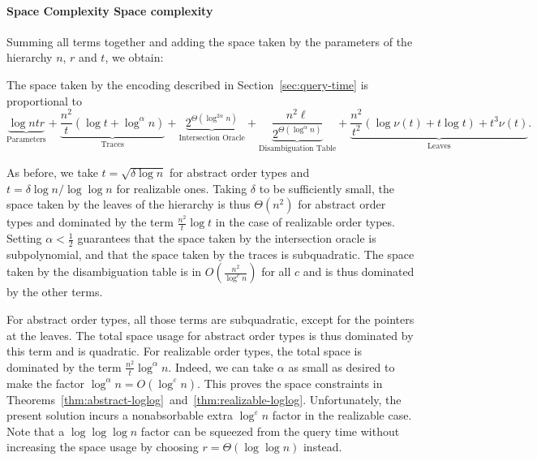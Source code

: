 \paragraph*{\iftitlecase%
Space Complexity\else%
Space complexity\fi}
Summing all terms together and adding the space taken by the
parameters of the hierarchy \(n\), \(r\) and \(t\), we obtain:
\begin{lemma}\label{lem:space-2-all-query}
  The space taken by the encoding described in Section~\ref{sec:query-time} is
  proportional to
    \begin{displaymath}
    \underbrace{\log ntr}_{\text{Parameters}}
    +
    \underbrace{\frac{n^2}{t} (\log t + \log^{\alpha} n)}_{\text{Traces}}
    +
    \underbrace{2^{\Theta(\log^{2\alpha} n)}}_{\text{Intersection Oracle}}
    +
    \underbrace{\frac{n^2 \ell}{2^{\Theta(\log^{\alpha} n)}}}_{\text{Disambiguation Table}}
    +
    \underbrace{\frac{n^2}{t^2} ( \log \nu(t) + t \log t) + t^3 \nu(t)}_{\text{Leaves}}.
    \end{displaymath}
\end{lemma}
As before,
we take \(t = \sqrt{\delta \log n}\) for abstract order types and \(t = \delta
\log n / \log\log n\) for realizable ones.
Taking \(\delta\) to be sufficiently small,
the space taken by the leaves of the hierarchy is thus \(\Theta(n^2)\) for
abstract order types and dominated by the term \(\frac{n^2}{t} \log t\)
in the case of realizable order types.
%
Setting \(\alpha < \frac 12\)
guarantees
that the space taken by the intersection oracle is subpolynomial,
and
that the space taken by the traces is subquadratic.
%
The space taken by the
disambiguation table is in \(O(\frac{n^2}{\log^c n})\) for all \(c\) and is
thus dominated by the other terms.

For abstract order types, all those terms are subquadratic, except for the
pointers at the leaves. The total space
usage for abstract order types is thus dominated by this term and
is quadratic.
%
For realizable order types, the total space is dominated by the term
\(\frac{n^2}{t} \log^{\alpha} n\).
Indeed, we can take \(\alpha\) as small as desired
to make the factor \(\log^{\alpha} n = O(\log^{\varepsilon} n)\).
%
This proves the space constraints in
Theorems~\ref{thm:abstract-loglog}~and~\ref{thm:realizable-loglog}.
%
Unfortunately, the present solution incurs a nonabsorbable
extra \(\log^{\varepsilon} n\) factor in the realizable case. Note that a
\(\log{\log{\log{n}}}\) factor can be squeezed from the query time without
increasing the space usage by choosing \(r = \Theta(\log \log n)\) instead.


